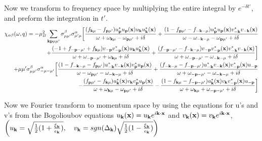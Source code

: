 \documentclass[prb,showpacs,amssymb,amsmath,twocolumn]{revtex4-1}
\begin{document}
\begin{widetext}
Now we transform to frequency space by multiplying the entire integral by $e^{- \delta t'}$, and preform the integration in $t'$.
\begin{align*}
\chi_{\alpha\beta}(\omega,q) = -\mu_B^2 \sum\limits_{{\bf k}{\bf p}\mu\mu'} \sigma^\beta_{\mu\mu'}\sigma^\alpha_{\mu'\mu}\bigg[\frac{(f_{{\bf k}\mu}-f_{{\bf p}\mu'})u^*_{\bf p} u_{\bf p}({\bf x})u_{\bf k} u^*_{\bf k}({\bf x})}{\omega+\omega_{{\bf k}\mu}-\omega_{{\bf p}\mu'}+i\delta}
+\frac{(1-f_{{\bf p}\mu'}-f_{-{\bf k}-\mu})u^*_{\bf p} u_{\bf p}({\bf x})v^*_{-{\bf k}}v_{-{\bf k}}({\bf x})}{\omega-\omega_{-{\bf k}-\mu}-\omega_{{\bf p}\mu'}+i\delta}\\
+\frac{(-1+f_{-{\bf p}-\mu'}+f_{{\bf k}\mu})v_{-{\bf p}}v^*_{-{\bf p}}({\bf x})u_{\bf k} u^*_{\bf k}({\bf x})}{\omega+\omega_{-{\bf p}-\mu'}+\omega_{{\bf k}\mu}+i\delta}
+\frac{(f_{-{\bf p}-\mu'}-f_{-{\bf k}-\mu})v_{-{\bf p}}v^*_{-{\bf p}}({\bf x})v^*_{-{\bf k}}v_{-{\bf k}}({\bf x})}{\omega+\omega_{-{\bf p}-\mu'}-\omega_{-{\bf k}-\mu}+i\delta}\bigg] 
\\
+\mu\mu' \sigma^\beta_{\mu\mu'}\sigma^\alpha_{-\mu-\mu'}\bigg[\frac{(1-f_{-{\bf k}-\mu}-f_{{\bf p}\mu'})u^*_{-{\bf k}}v_{-{\bf k}}({\bf x})v^*_{\bf p} u_{\bf p}({\bf x})}{\omega-\omega_{{\bf p}\mu'} - \omega_{-{\bf k}-\mu}+i\delta}
+\frac{(f_{-{\bf k}-\mu}-f_{-{\bf p}-\mu'})u^*_{-{\bf k}}v_{-{\bf k}}({\bf x})v^*_{-{\bf p}}({\bf x})u_{-{\bf p}}}{\omega+\omega_{-{\bf p}-\mu'}-\omega_{-{\bf k}-\mu}+i\delta} \\
-\frac{(f_{{\bf p}\mu'}-f_{{\bf k}\mu})u^*_{\bf k}({\bf x})v_{\bf k} v^*_{\bf p} u_{\bf p}({\bf x})}{\omega+\omega_{{\bf k}\mu}-\omega_{{\bf p}\mu'}+i\delta}
-\frac{(1-f_{{\bf k}\mu}-f_{-{\bf p}-\mu'})u^*_{\bf k}({\bf x})v_{\bf k} v^*_{-{\bf p}}({\bf x})u_{-{\bf p}}}{\omega+\omega_{{\bf k}\mu}+\omega_{-{\bf p}-\mu'}+i\delta}\bigg]
\end{align*}

Now we Fourier transform to momentum space by using the equations for u's and v's from the Bogolioubov equations $u_{\bf k}({\bf x})=u_{\bf k} e^{i{\bf k}\cdot{\bf x}}$ and $v_{\bf k}({\bf x})=v_{\bf k} e^{i{\bf k}\cdot{\bf x}}$, $\bigg(u_{\bf k} = \sqrt{\frac{1}{2}(1+\frac{\xi_{\bf k}}{\epsilon_{\bf k}})},\quad v_{\bf k} = sgn(\Delta_{\bf k})\sqrt{\frac{1}{2}(1-\frac{\xi_{\bf k}}{\epsilon_{\bf k}})}\bigg)$


\end{widetext}
\end{document}
